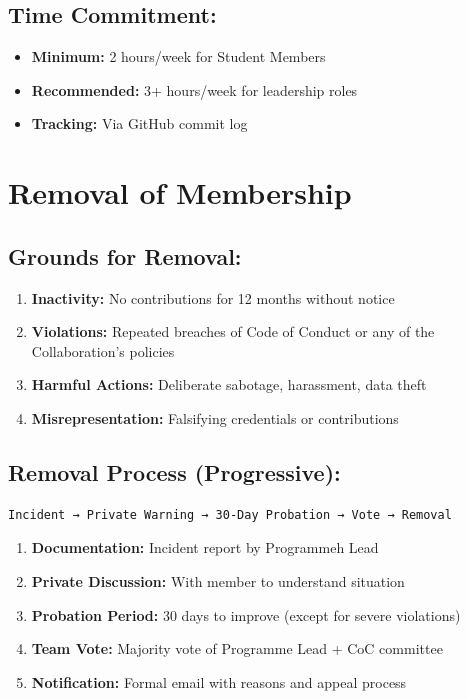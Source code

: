\documentclass[11pt,a4paper]{article}
\begin{document}
\subsection{Time Commitment:}
\begin{itemize}
\item \textbf{Minimum:} 2 hours/week for Student Members
\item \textbf{Recommended:} 3+ hours/week for leadership roles
\item \textbf{Tracking:} Via GitHub commit log
\end{itemize}

\section{Removal of Membership}

\subsection{Grounds for Removal:}
\begin{enumerate}
\item \textbf{Inactivity:} No contributions for 12 months without notice
\item \textbf{Violations:} Repeated breaches of Code of Conduct or any of the Collaboration's policies
\item \textbf{Harmful Actions:} Deliberate sabotage, harassment, data theft
\item \textbf{Misrepresentation:} Falsifying credentials or contributions
\end{enumerate}

\subsection{Removal Process (Progressive):}
\begin{verbatim}
Incident → Private Warning → 30-Day Probation → Vote → Removal
\end{verbatim}
\begin{enumerate}
\item \textbf{Documentation:} Incident report by Programmeh Lead
\item \textbf{Private Discussion:} With member to understand situation
\item \textbf{Probation Period:} 30 days to improve (except for severe violations)
\item \textbf{Team Vote:} Majority vote of Programme Lead + CoC committee
\item \textbf{Notification:} Formal email with reasons and appeal process
\end{enumerate}
\end{document}
